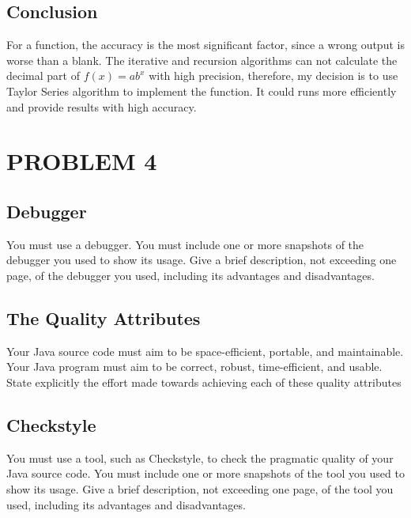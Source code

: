 \documentclass[11pt]{article}
\begin{document}
\subsection{Conclusion}
For a function, the accuracy is the most significant factor, since a wrong output is worse than a blank. The iterative and recursion algorithms can not calculate the decimal part of $f(x) = ab^x$ with high precision, therefore, my decision is to use Taylor Series algorithm to implement the function. It could runs more efficiently and provide results with high accuracy.

\section{ PROBLEM 4}
\subsection{Debugger}
You must use a debugger. You must include one or more snapshots of the debugger you used to show its usage. Give a brief description, not exceeding one page, of the debugger you used, including its advantages and disadvantages.

\subsection{The Quality Attributes}
Your Java source code must aim to be space-efficient, portable, and maintainable. Your Java program must aim to be correct, robust, time-efficient, and usable. State explicitly the effort made towards achieving each of these quality attributes

\subsection{Checkstyle}
You must use a tool, such as Checkstyle, to check the pragmatic quality of your Java source code. You must include one or more snapshots of the tool you used to show its usage. Give a brief description, not exceeding one page, of the tool you used, including its advantages and disadvantages. 

\newpage


\end{document}
